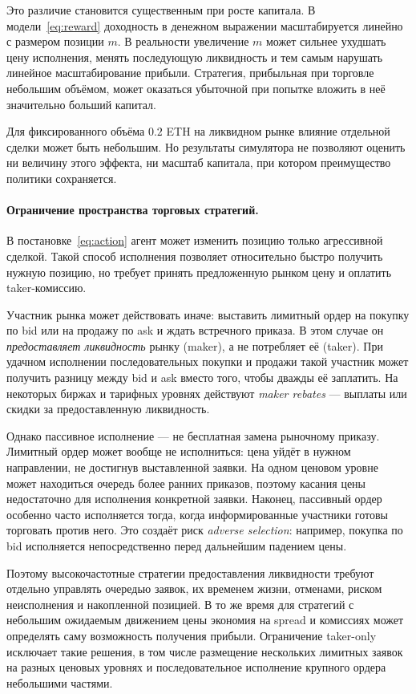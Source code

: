 \documentclass[9pt,a4paper,twocolumn]{extarticle}
\begin{document}
Это различие становится существенным при росте капитала. В модели~\eqref{eq:reward} доходность в
денежном выражении масштабируется линейно с размером позиции $m$. В реальности увеличение $m$
может сильнее ухудшать цену исполнения, менять последующую ликвидность и тем самым нарушать
линейное масштабирование прибыли. Стратегия, прибыльная при торговле небольшим объёмом, может
оказаться убыточной при попытке вложить в неё значительно больший капитал.

Для фиксированного объёма $0.2$ ETH на ликвидном рынке влияние отдельной сделки может быть
небольшим. Но результаты симулятора не позволяют оценить ни величину этого эффекта, ни масштаб
капитала, при котором преимущество политики сохраняется.

\paragraph{Ограничение пространства торговых стратегий.}

В постановке~\eqref{eq:action} агент может изменить позицию только агрессивной сделкой. Такой
способ исполнения позволяет относительно быстро получить нужную позицию, но требует принять
предложенную рынком цену и оплатить taker-комиссию.

Участник рынка может действовать иначе: выставить лимитный ордер на покупку по bid или на
продажу по ask и ждать встречного приказа. В этом случае он \emph{предоставляет ликвидность}
рынку (maker), а не потребляет её (taker). При удачном исполнении последовательных покупки и
продажи такой участник может получить разницу между bid и ask вместо того, чтобы дважды её
заплатить. На некоторых биржах и тарифных уровнях действуют \emph{maker rebates} --- выплаты или
скидки за предоставленную ликвидность.

Однако пассивное исполнение --- не бесплатная замена рыночному приказу. Лимитный ордер может
вообще не исполниться: цена уйдёт в нужном направлении, не достигнув выставленной заявки. На
одном ценовом уровне может находиться очередь более ранних приказов, поэтому касания цены
недостаточно для исполнения конкретной заявки. Наконец, пассивный ордер особенно часто
исполняется тогда, когда информированные участники готовы торговать против него. Это создаёт
риск \emph{adverse selection}: например, покупка по bid исполняется непосредственно перед
дальнейшим падением цены.

Поэтому высокочастотные стратегии предоставления ликвидности требуют отдельно управлять очередью
заявок, их временем жизни, отменами, риском неисполнения и накопленной позицией. В то же время
для стратегий с небольшим ожидаемым движением цены экономия на spread и комиссиях может
определять саму возможность получения прибыли. Ограничение taker-only исключает такие решения, в
том числе размещение нескольких лимитных заявок на разных ценовых уровнях и последовательное
исполнение крупного ордера небольшими частями.
\end{document}
